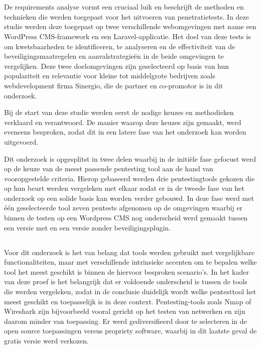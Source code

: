 \section{}
De requirements analyse vormt een cruciaal luik en beschrijft de methoden en technieken die werden toegepast 
voor het uitvoeren van penetratietests. In deze studie werden deze toegepast op twee 
verschillende webomgevingen met name een WordPress CMS-framework en een Laravel-applicatie. Het doel van deze tests is om kwetsbaarheden te identificeren, te 
analyseren en de effectiviteit van de beveiligingsmaatregelen en aanvalstrategieën in de beide omgevingen te vergelijken.
Deze twee doelomgevingen zijn geselecteerd op basis van hun populariteit en relevantie voor kleine tot middelgrote bedrijven 
zoals webdevelopment firma Sinergio, die de partner en co-promotor is in dit onderzoek.

Bij de start van deze studie werden eerst de nodige keuzes en methodieken verklaard en verantwoord. De manier waarop deze keuzes zijn gemaakt, werd eveneens 
besproken, zodat dit in een latere fase van het onderzoek kan worden uitgevoerd.

Dit onderzoek is opgesplitst in twee delen waarbij in de initiële fase gefocust werd op de keuze van de meest passende pentesting tool 
aan de hand van vooropgestelde criteria. Hierop gebaseerd werden drie pentestingtools gekozen die op hun beurt werden vergeleken met elkaar 
zodat er in de tweede fase van het onderzoek op een solide basis kan worden verder gebouwd. In deze fase werd met één geselecteerde 
tool zeven pentests afgenomen op de omgevingen waarbij er binnen de testen op een Wordpress CMS nog onderscheid werd gemaakt 
tussen een versie met en een versie zonder beveiligingsplugin.

\subsection{}
Voor dit onderzoek is het van 
belang dat tools werden gebruikt met vergelijkbare functionaliteiten, maar met verschillende intrinsieke accenten om te bepalen welke 
tool het meest geschikt is binnen de hiervoor besproken scenario's. In het kader van deze proef is het belangrijk dat er voldoende onderscheid is tussen de tools 
die werden vergeleken, zodat in de conclusie duidelijk wordt welke pentesttool het meest geschikt en toepasselijk is in deze context. 
Pentesting-tools zoals Nmap of Wireshark zijn bijvoorbeeld vooral gericht op het testen van netwerken en  zijn daarom minder van toepassing. Er werd 
gediversifieerd door te selecteren in de open source toepassingen versus propriety software, waarbij in dit laatste geval de gratis versie werd 
verkozen. 

